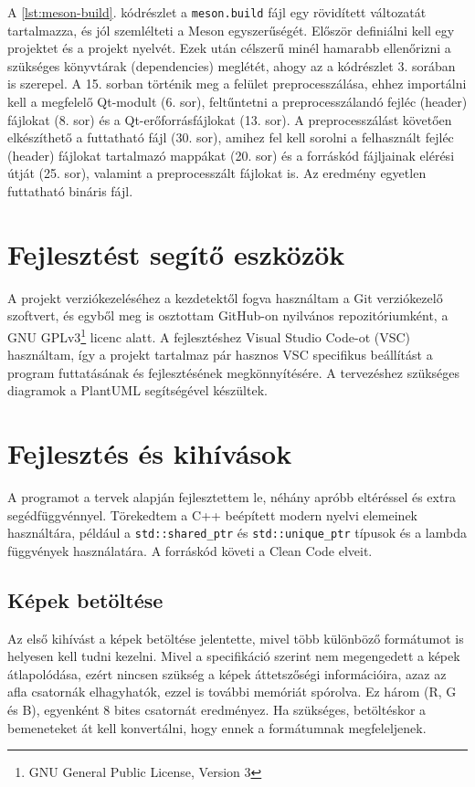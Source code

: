 A \ref{lst:meson-build}. kódrészlet a \texttt{meson.build} fájl egy rövidített változatát tartalmazza, és jól szemlélteti a Meson egyszerűségét. Először definiálni kell egy projektet és a projekt nyelvét. Ezek után célszerű minél hamarabb ellenőrizni a szükséges könyvtárak (dependencies) meglétét, ahogy az a kódrészlet 3. sorában is szerepel. A 15. sorban történik meg a felület preprocesszálása, ehhez importálni kell a megfelelő Qt-modult (6. sor), feltűntetni a preprocesszálandó fejléc (header) fájlokat (8. sor) és a Qt-erőforrásfájlokat (13. sor). A preprocesszálást követően elkészíthető a futtatható fájl (30. sor), amihez fel kell sorolni a felhasznált fejléc (header) fájlokat tartalmazó mappákat (20. sor) és a forráskód fájljainak elérési útját (25. sor), valamint a preprocesszált fájlokat is. Az eredmény egyetlen futtatható bináris fájl.

\section{Fejlesztést segítő eszközök}

A projekt verziókezeléséhez a kezdetektől fogva használtam a Git verziókezelő szoftvert, és egyből meg is osztottam GitHub-on nyilvános repozitóriumként, a GNU GPLv3\footnote[2]{GNU General Public License, Version 3} licenc alatt. A fejlesztéshez Visual Studio Code-ot (VSC) használtam, így a projekt tartalmaz pár hasznos  VSC specifikus beállítást a program futtatásának és fejlesztésének megkönnyítésére. A tervezéshez szükséges diagramok a PlantUML segítségével készültek.


\section{Fejlesztés és kihívások}

A programot a tervek alapján fejlesztettem le, néhány apróbb eltéréssel és extra segédfüggvénnyel. Törekedtem a C++ beépített modern nyelvi elemeinek használtára, például a \texttt{std::shared\_ptr} és \texttt{std::unique\_ptr} típusok és a lambda függvények használatára. A forráskód követi a Clean Code elveit.

\subsection{Képek betöltése}

Az első kihívást a képek betöltése jelentette, mivel több különböző formátumot is helyesen kell tudni kezelni. Mivel a specifikáció szerint nem megengedett a képek átlapolódása, ezért nincsen szükség a képek áttetszőségi információira, azaz az afla csatornák elhagyhatók, ezzel is további memóriát spórolva. Ez három (R, G és B), egyenként 8 bites csatornát eredményez. Ha szükséges, betöltéskor a bemeneteket át kell konvertálni, hogy ennek a formátumnak megfeleljenek. 

